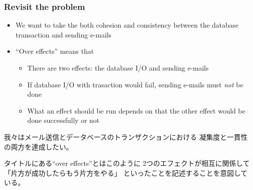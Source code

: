 \begin{frame}
  \frametitle{Revisit the problem}

  \begin{itemize}
    \item<+-> We want to take the both cohesion and consistency between
    the database transaction and sending e-mails

    \item<+-> ``Over effects'' means that
    \begin{itemize}
      \item There are two effects: the database I/O and sending e-mails

      \item If database I/O with trasaction would fail,
      sending e-mails must \emph{not} be done

      \item What an effect should be run
      depends on that the other effect would be done successfully or not
    \end{itemize}
  \end{itemize}

  \begin{notes}
    \item 我々はメール送信とデータベースのトランザクションにおける
    凝集度と一貫性の両方を達成したい。

    \item タイトルにある``over effects''とはこのように
    2つのエフェクトが相互に関係して「片方が成功したらもう片方をやる」
    といったことを記述することを意図している。
  \end{notes}
\end{frame}

